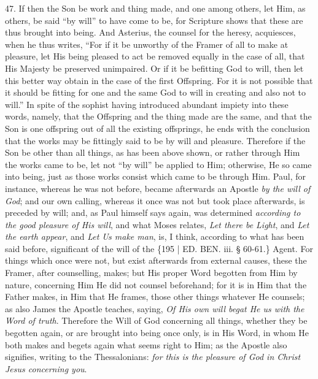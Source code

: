 47. If then the Son be work
and thing made, and one among others, let Him, as others, be said ``by
will'' to have come to be, for Scripture shows that these are thus
brought into being. And Asterius, the counsel for the heresy,
acquiesces, when he thus writes, ``For if it be unworthy of the Framer
of all to make at pleasure, let His being pleased to act be removed
equally in the case of all, that His Majesty be preserved unimpaired.
Or if it be befitting God to will, then let this better way obtain in
the case of the first Offspring. For it is not possible that it should
be fitting for one and the same God to will in creating and also not
to will.'' In spite of the sophist having introduced abundant impiety
into these words, namely, that the Offspring and the thing made are
the same, and that the Son is one offspring out of all the existing
offsprings, he ends with the conclusion that the works may be
fittingly said to be by will and pleasure. Therefore if the Son be
other than all things, as has been above shown, or rather through Him
the works came to be, let not ``by will'' be applied to Him; otherwise,
He so came into being, just as those works consist which came to be
through Him. Paul, for instance, whereas he was not before, became
afterwards an Apostle \emph{by the will of God}; and our own calling,
whereas it once was not but took place afterwards, is preceded by
will; and, as Paul himself says again, was determined \emph{according to
the good pleasure of His will}, and what Moses relates, \emph{Let
there be Light}, and \emph{Let the earth appear}, and \emph{Let Us
make man}, is, I think, according to what has been said before,
significant of the will of the \{195 | ED. BEN. iii. § 60-61.\}
Agent. For things which once were not, but exist afterwards from
external causes, these the Framer, after counselling, makes; but His
proper Word begotten from Him by nature, concerning Him He did not
counsel beforehand; for it is in Him that the Father makes, in Him
that He frames, those other things whatever He counsels; as also James
the Apostle teaches, saying, \emph{Of His own will begat He us with the
Word of truth}. Therefore the Will of God concerning all things,
whether they be begotten again, or are brought into being once only,
is in His Word, in whom He both makes and begets again what seems
right to Him; as the Apostle also signifies, writing to the
Thessalonians: \emph{for this is the pleasure of God in Christ Jesus
concerning you}.

